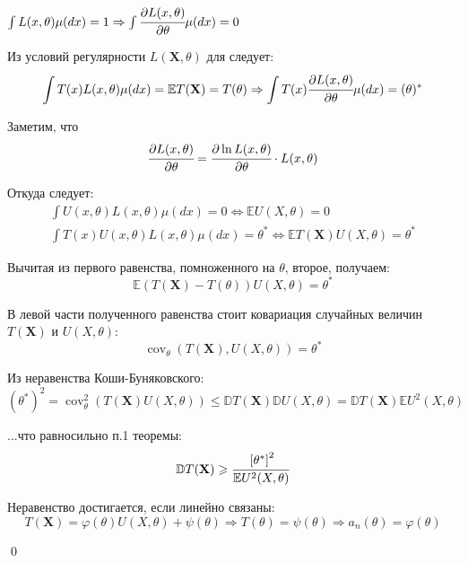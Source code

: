\documentclass[oneside,final,14pt]{extreport}
\renewenvironment{proof}{{\bfseries Доказательство.}}{\qed}
\theoremstyle{plain}
\theoremstyle{definition}
\theoremstyle{named}
\begin{document}
\begin{proof}
$\int L(x, \theta) \mu(d x)=1 \Rightarrow \int \cfrac{\partial L(x, \theta)}{\partial \theta} \mu(d x)=0$

Из условий регулярности $L(\mathbf{X}, \theta)$ для следует:
\begin{equation*}
    \int T(x) L(x, \theta) \mu(d x)=\mathbb{E} T(\mathbf{X})=T(\theta) \Rightarrow \int T(x) \cfrac{\partial L(x, \theta)}{\partial \theta} \mu(d x)=(\theta)^{*}
\end{equation*}

Заметим, что
\begin{equation*}
    \cfrac{\partial L(x, \theta)}{\partial \theta}=\cfrac{\partial \ln L(x, \theta)}{\partial \theta} \cdot L(x, \theta)
\end{equation*}

Откуда следует:
\begin{gather*}
    \int U(x, \theta) L(x, \theta) \mu(d x)=0 \Leftrightarrow \mathbb{E} U(X, \theta)=0 \\
\int T(x) U(x, \theta) L(x, \theta) \mu(d x)=\theta^{*} \Leftrightarrow \mathbb{E} T(\mathbf{X}) U(X, \theta)=\theta^{*}
\end{gather*}

Вычитая из первого равенства, помноженного на $\theta$, второе, получаем:
\begin{equation*}
    \mathbb{E}(T(\mathbf{X})-T(\theta)) U(X, \theta)=\theta^{*}
\end{equation*}

В левой части полученного равенства стоит ковариация случайных величин $T(\mathbf{X})$ и $U(X,\theta)$:
\begin{equation*}
    \operatorname{cov}_{\theta}(T(\mathbf{X}), U(X, \theta))=\theta^{*}
\end{equation*}

Из неравенства Коши-Буняковского:
\begin{equation*}
    \left(\theta^{*}\right)^{2}=\operatorname{cov}_{\theta}^{2}(T(\mathbf{X}) U(X, \theta)) \leqslant \mathbb{D} T(\mathbf{X}) \mathbb{D} U(X, \theta)=\mathbb{D} T(\mathbf{X}) \mathbb{E} U^{2}(X, \theta)
\end{equation*}

...что равносильно п.1 теоремы:
\begin{equation*}
    \mathbb{D} T(\mathbf{X}) \geqslant \cfrac{\left[\theta^{*}\right]^{2}}{\mathbb{E} U^{2}(X, \theta)}
\end{equation*}

Неравенство достигается, если линейно связаны:
\begin{equation*}
    T(\mathbf{X})=\varphi(\theta) U(X, \theta)+\psi(\theta) \Rightarrow T(\theta)=\psi(\theta) \Rightarrow a_{n}(\theta)=\varphi(\theta)
\end{equation*}

\end{proof}
\end{document}
